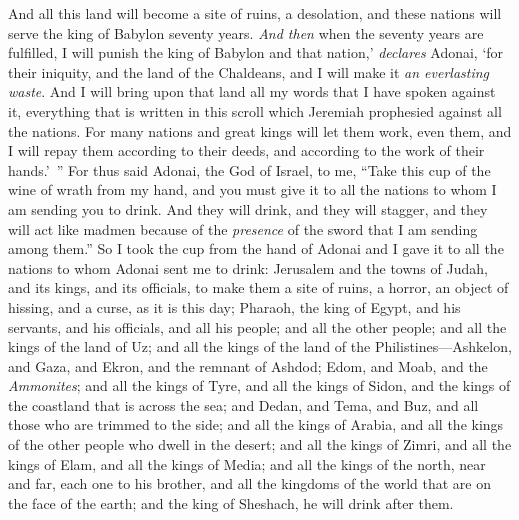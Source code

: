 \begin{biblechapter}
\verse And all this land will become a site of ruins, a desolation, and these nations will serve the king of Babylon seventy years.
 \textit{And then} when the seventy years are fulfilled, I will punish the king of Babylon and that nation,’ \textit{declares} Adonai, ‘for their iniquity, and the land of the Chaldeans, and I will make it \textit{an everlasting waste}.
\verse And I will bring upon that land all my words that I have spoken against it, everything that is written in this scroll which Jeremiah prophesied against all the nations.
\verse For many nations and great kings will let them work, even them, and I will repay them according to their deeds, and according to the work of their hands.’ ”
\verse For thus said Adonai, the God of Israel, to me, “Take this cup of the wine of wrath from my hand, and you must give it to all the nations to whom I am sending you to drink.
\verse And they will drink, and they will stagger, and they will act like madmen because of the \textit{presence} of the sword that I am sending among them.”
\verse So I took the cup from the hand of Adonai and I gave it to all the nations to whom Adonai sent me to drink:
\verse Jerusalem and the towns of Judah, and its kings, and its officials, to make them a site of ruins, a horror, an object of hissing, and a curse, as it is this day;
\verse Pharaoh, the king of Egypt, and his servants, and his officials, and all his people;
\verse and all the other people; and all the kings of the land of Uz; and all the kings of the land of the Philistines—Ashkelon, and Gaza, and Ekron, and the remnant of Ashdod;
\verse Edom, and Moab, and the \textit{Ammonites};
\verse and all the kings of Tyre, and all the kings of Sidon, and the kings of the coastland that is across the sea;
\verse and Dedan, and Tema, and Buz, and all those who are trimmed to the side;
\verse and all the kings of Arabia, and all the kings of the other people who dwell in the desert;
\verse and all the kings of Zimri, and all the kings of Elam, and all the kings of Media;
\verse and all the kings of the north, near and far, each one to his brother, and all the kingdoms of the world that are on the face of the earth; and the king of Sheshach, he will drink after them.

\end{biblechapter}
